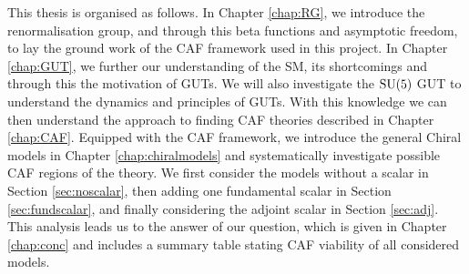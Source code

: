 This thesis is organised as follows. In Chapter \ref{chap:RG}, we introduce the renormalisation group, and through this beta functions and asymptotic freedom, to lay the ground work of the CAF framework used in this project. In Chapter \ref{chap:GUT}, we further our understanding of the SM, its shortcomings and through this the motivation of GUTs. We will also investigate the $\mathrm{SU}(5)$ GUT to understand the dynamics and principles of GUTs. With this knowledge we can then understand the approach to finding CAF theories described in Chapter \ref{chap:CAF}. Equipped with the CAF framework, we introduce the general Chiral models in Chapter \ref{chap:chiralmodels} and systematically investigate possible CAF regions of the theory. We first consider the models without a scalar in Section \ref{sec:noscalar}, then adding one fundamental scalar in Section \ref{sec:fundscalar}, and finally considering the adjoint scalar in Section \ref{sec:adj}. This analysis leads us to the answer of our question, which is given in Chapter \ref{chap:conc} and includes a summary table stating CAF viability of all considered models.
